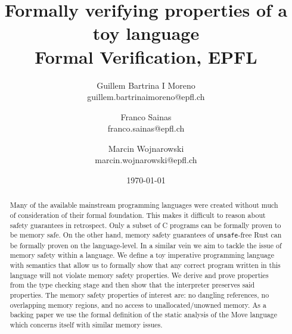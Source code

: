 \documentclass[notitlepage]{article}
\title{Formally verifying properties of a toy language\\\large Formal Verification, EPFL}
\author{
	Guillem Bartrina I Moreno \\ \normalsize guillem.bartrinaimoreno@epfl.ch \and
	Franco Sainas \\ \normalsize franco.sainas@epfl.ch \and
	Marcin Wojnarowski \\ \normalsize marcin.wojnarowski@epfl.ch
}
\date{\today}
\begin{document}
\maketitle

\begin{abstract}
	Many of the available mainstream programming languages were created without much of consideration of their formal foundation. This makes it difficult to reason about safety guarantees in retrospect. Only a subset of C programs can be formally proven to be memory safe. On the other hand, memory safety guarantees of \texttt{unsafe}-free Rust can be formally proven on the language-level\cite{10.1145/3158154}. In a similar vein we aim to tackle the issue of memory safety within a language. We define a toy imperative programming language with semantics that allow us to formally show that any correct program written in this language will not violate memory safety properties. We derive and prove properties from the type checking stage and then show that the interpreter preserves said properties. The memory safety properties of interest are: no dangling references, no overlapping memory regions, and no access to unallocated/unowned memory. As a backing paper we use the formal definition of the static analysis of the Move language\cite{blackshear2022borrow} which concerns itself with similar memory issues.
\end{abstract}

\printbibliography
\end{document}
